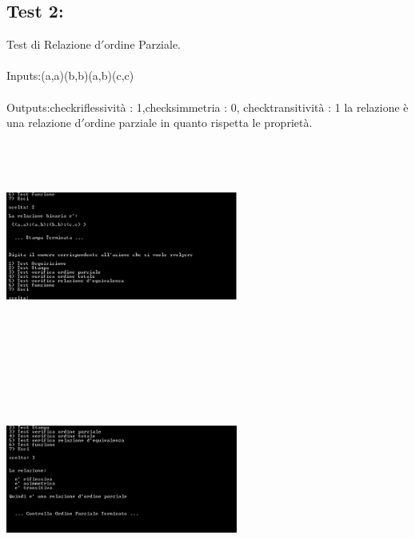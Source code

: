 \documentclass[11pt, a4paper, titlepage, block]{article}
\begin{document}
	\subsection{Test 2:}
	Test di Relazione d$'$ordine Parziale.\\
	\\
	Inputs:(a,a)(b,b)(a,b)(c,c)\\
	\\
	Outputs:checkriflessivit\`a : 1,checksimmetria : 0, checktransitivit\`a : 1
	la relazione \`e una relazione d$'$ordine parziale in quanto rispetta le propriet\`a.\\
	\includegraphics[width=3in,height=3in,viewport=0 0 300 300]{../Screenshots/Test2Input.png}
	\\
	\includegraphics[width=3in,height=3in,viewport=0 0 300 300]{../Screenshots/Test2Output.png}
	\\
	\\
	\newpage
\end{document}
